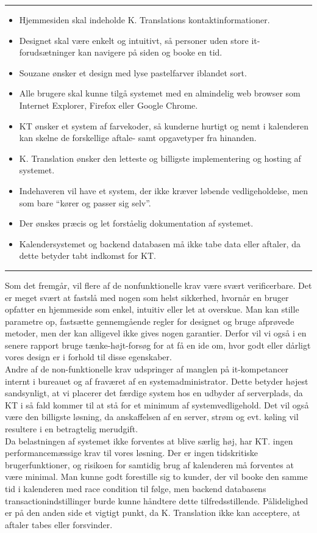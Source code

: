 \documentclass[12pt]{article}   %
\begin{document}
\rule{120mm}{1mm}
\begin{itemize}
\item Hjemmesiden skal indeholde K. Translations kontaktinformationer.
\item Designet skal være enkelt	og intuitivt, så personer uden store it-forudsætninger kan navigere på siden og booke en tid.
\item Souzane ønsker et design med lyse pastelfarver iblandet sort. 
\item Alle brugere skal kunne tilgå systemet med en almindelig web browser som Internet Explorer, Firefox eller Google Chrome.
\item KT ønsker et system af farvekoder, så kunderne hurtigt og nemt i kalenderen kan skelne de forskellige aftale- samt opgavetyper fra hinanden.
\item K. Translation ønsker den letteste og billigste implementering og hosting af systemet.
\item Indehaveren vil have et system, der ikke kræver løbende
	vedligeholdelse, men som bare ``kører og passer sig selv''.   
\item Der ønskes præcis og let forståelig dokumentation af systemet. 
\item Kalendersystemet og backend databasen må ikke tabe data eller aftaler, da dette betyder tabt indkomst for KT.
\end{itemize}
\rule{120mm}{1mm}
\vspace{0.5cm}

Som det fremgår, vil flere af de nonfunktionelle krav være svært verificerbare. Det er meget svært at fastslå med nogen som helst sikkerhed, hvornår en bruger opfatter en hjemmeside som enkel, intuitiv eller let at overskue. Man kan stille
parametre op, fastsætte gennemgående regler for designet og bruge afprøvede metoder, men der kan alligevel ikke gives nogen garantier. Derfor vil vi også i en senere rapport bruge tænke-højt-forsøg for at få en ide om, hvor godt
eller dårligt vores design er i forhold til disse egenskaber. \\
 Andre af de non-funktionelle krav udspringer af manglen på it-kompetancer internt i bureauet og af fraværet af en systemadministrator. Dette betyder højest sandsynligt, at vi 
placerer det færdige system hos en udbyder af serverplads, da KT i så fald kommer til at stå for et minimum af systemvedligehold. Det vil også være den billigste
løsning, da anskaffelsen af en server, strøm og evt. køling vil resultere i en betragtelig merudgift. \\
Da belastningen af systemet ikke forventes at blive særlig høj, har KT. ingen performancemæssige krav til vores løsning. Der er ingen tidskritiske brugerfunktioner, og risikoen for samtidig brug af kalenderen må forventes at være minimal. Man kunne godt forestille sig to kunder, der vil booke den samme 
tid i kalenderen med race condition til følge, men backend
databasens transactionindstillinger burde kunne håndtere dette
tilfredsstillende. Pålidelighed er på den anden side et vigtigt punkt, da K. Translation ikke kan acceptere, at aftaler tabes eller forsvinder. \\ 
\end{document}
